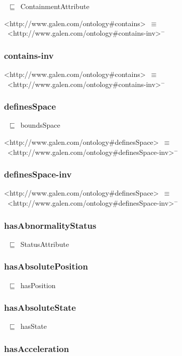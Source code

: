 \documentclass{article}
\begin{document}
~\ensuremath{\sqsubseteq}~ContainmentAttribute

<http://www.galen.com/ontology#contains>~\ensuremath{\equiv}~<http://www.galen.com/ontology#contains-inv>\ensuremath{^-}

\subsubsection*{contains-inv}

<http://www.galen.com/ontology#contains>~\ensuremath{\equiv}~<http://www.galen.com/ontology#contains-inv>\ensuremath{^-}

\subsubsection*{definesSpace}

~\ensuremath{\sqsubseteq}~boundsSpace

<http://www.galen.com/ontology#definesSpace>~\ensuremath{\equiv}~<http://www.galen.com/ontology#definesSpace-inv>\ensuremath{^-}

\subsubsection*{definesSpace-inv}

<http://www.galen.com/ontology#definesSpace>~\ensuremath{\equiv}~<http://www.galen.com/ontology#definesSpace-inv>\ensuremath{^-}

\subsubsection*{hasAbnormalityStatus}

~\ensuremath{\sqsubseteq}~StatusAttribute

\subsubsection*{hasAbsolutePosition}

~\ensuremath{\sqsubseteq}~hasPosition

\subsubsection*{hasAbsoluteState}

~\ensuremath{\sqsubseteq}~hasState

\subsubsection*{hasAcceleration}
\end{document}
